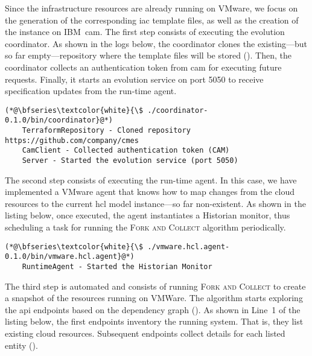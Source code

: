Since the infrastructure resources are already running on VMware, we focus on the generation of the corresponding \gls{iac} template files, as well as the creation of the instance on IBM~\gls{cam}. The first step consists of executing the evolution coordinator. As shown in the logs below, the coordinator clones the existing---but so far empty---repository where the template files will be stored (). Then, the coordinator collects an authentication token from \gls{cam} for executing future requests. Finally, it starts an evolution service on port 5050 to receive specification updates from the run-time agent.

\begin{mdframed}[style=consolestyle]
	\vspace{0.3em}
	\begin{lstlisting}[style=console]
	(*@\bfseries\textcolor{white}{\$ ./coordinator-0.1.0/bin/coordinator}@*)
	TerraformRepository - Cloned repository https://github.com/company/cmes
	CamClient - Collected authentication token (CAM)
	Server - Started the evolution service (port 5050)
	\end{lstlisting}
	\vspace{-0.3em}
\end{mdframed}

The second step consists of executing the run-time agent. In this case, we have implemented a VMware agent that knows how to map changes from the cloud resources to the current \gls{hcl} model instance---so far non-existent. As shown in the listing below, once executed, the agent instantiates a Historian monitor, thus scheduling a task for running the \textsc{Fork and Collect} algorithm periodically.

\begin{mdframed}[style=consolestyle]
	\vspace{0.3em}
	\begin{lstlisting}[style=console]
	(*@\bfseries\textcolor{white}{\$ ./vmware.hcl.agent-0.1.0/bin/vmware.hcl.agent}@*)
	RuntimeAgent - Started the Historian Monitor
	\end{lstlisting}
	\vspace{-0.3em}
\end{mdframed}

The third step is automated and consists of running \textsc{Fork and Collect} to create a snapshot of the resources running on VMWare. The algorithm starts exploring the \gls{api} endpoints based on the dependency graph (). As shown in Line~1 of the listing below, the first endpoints inventory the running system. That is, they list existing cloud resources. Subsequent endpoints collect details for each listed entity ().

